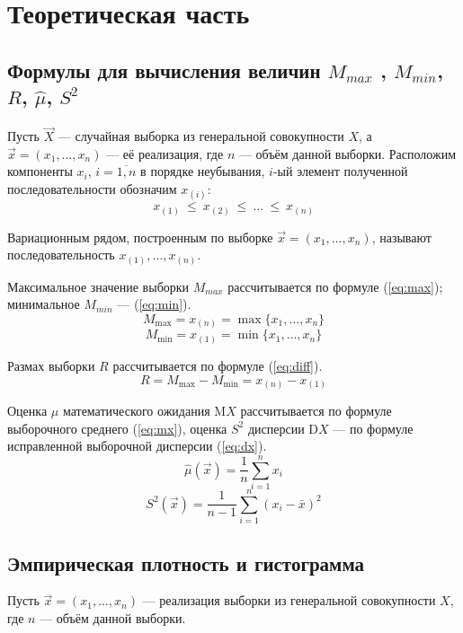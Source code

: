 \chapter{Теоретическая часть}
\section{Формулы для вычисления величин $M_{max}$ , $M_{min}$, $R$, $\hat\mu$, $S^2$}

Пусть $\vec{X}$ --- случайная выборка из генеральной совокупности $X$, а $\vec{x} = (x_1, \dots, x_n)$ --- её реализация, где $n$ --- объём данной выборки.
Расположим компоненты $x_i$, $i=\overline{1,n}$ в порядке неубывания, $i$-ый элемент полученной последовательности обозначим $x_{(i)}$:
\begin{equation}
	\label{eq:leq}
	x_{(1)}~\leq~x_{(2)}~\leq~\dots~\leq~x_{(n)}
\end{equation}

Вариационным рядом, построенным по выборке $\vec{x} = (x_1, \dots, x_n)$, называют последовательность $x_{(1)}, \dots, x_{(n)}$.

Максимальное значение выборки $M_{max}$ рассчитывается по формуле (\ref{eq:max}); минимальное $M_{min}$ --- (\ref{eq:min}).
\begin{equation}
	\label{eq:max}
	M_{\max} = x_{(n)} =  \max\{x_1,\dots,x_n\}
\end{equation}
\begin{equation}
	\label{eq:min}
	M_{\min} = x_{(1)} = \min\{x_1,\dots,x_n\}
\end{equation}

Размах выборки $R$ рассчитывается по формуле (\ref{eq:diff}).
\begin{equation}
	\label{eq:diff}
	R = M_{\max} - M_{\min} = x_{(n)} - x_{(1)}
\end{equation}

Оценка $\hat\mu$ математического ожидания M$X$ рассчитывается по формуле выборочного среднего (\ref{eq:mx}), оценка $S^2$ дисперсии D$X$ --- по формуле исправленной выборочной дисперсии (\ref{eq:dx}).
\begin{equation}
	\label{eq:mx}
	\hat\mu(\vec x) = \frac 1n \sum_{i=1}^n x_i
\end{equation}
\begin{equation}
	\label{eq:dx}
	S^2(\vec x) = \frac 1{n - 1} \sum_{i=1}^n (x_i - \bar{x})^2
\end{equation}

\clearpage
\section{Эмпирическая плотность и гистограмма}
Пусть $\vec{x} = (x_1, \dots, x_n)$ --- реализация выборки из генеральной совокупности $X$, где $n$ --- объём данной выборки.

